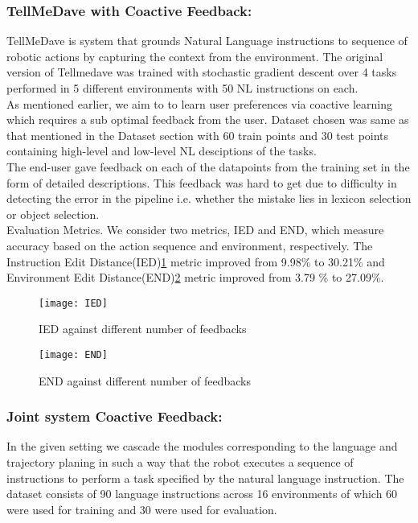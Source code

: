 	\subsubsection{TellMeDave with Coactive Feedback:} 
	TellMeDave is system that grounds Natural Language instructions to sequence of robotic actions by capturing the context from the environment. The original version of Tellmedave was trained with stochastic gradient descent over 4 tasks performed in 5 different environments with 50 NL instructions on each. \\
	As mentioned earlier, we aim to to learn user preferences via coactive learning which requires a sub optimal feedback from the user. Dataset chosen was same as that mentioned in the Dataset section with 60 train points and 30 test points containing high-level and low-level NL desciptions of the tasks. \\
	The end-user gave feedback on each of the datapoints from the training set in the form of detailed descriptions. This feedback was hard to get due to difficulty in detecting the error in the pipeline i.e. whether the mistake lies in lexicon selection or object selection. \\
	Evaluation Metrics. We consider two metrics, IED and END\cite{Misra2014tell}, which measure accuracy based on the action sequence and environment, respectively. The Instruction Edit Distance(IED)\ref{fig:IED} metric improved from 9.98\% to 30.21\% and Environment Edit Distance(END)\ref{fig:END} metric improved from 3.79 \% to 27.09\%.
 
	\begin{figure}[h]
		\texttt{[image: IED]}
		\centering
		\caption{IED against different number of feedbacks }
  		\label{fig:IED}
		\end{figure}
		
	\begin{figure}[h]
		\texttt{[image: END]}
		\centering
		\caption{END against different number of feedbacks }
  		\label{fig:END}
		\end{figure}

	\subsubsection{Joint system Coactive Feedback:}
	In the given setting we cascade the modules corresponding to the language and trajectory planing in such a way that the robot executes a sequence of instructions to perform a task specified by the natural language instruction. The dataset consists of 90 language instructions across 16 environments of which 60 were used for training and 30 were used for evaluation.


